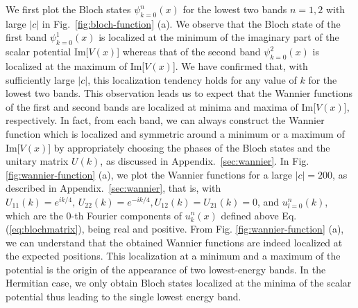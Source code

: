\documentclass[prb,superscriptaddress,floatfix,twocolumn,showpacs]{revtex4-2}
\begin{document}
We first plot the Bloch states $\psi_{k=0}^n (x)$ for the lowest two bands $n = 1,2$ with large $|c|$ in Fig.~\ref{fig:bloch-function} (a). 
We observe that the Bloch state of the first band $\psi_{k=0}^1(x)$ is localized at the minimum of the imaginary part of the scalar potential Im[$V(x)$] whereas that of the second band $\psi_{k=0}^2(x)$ is localized at the maximum of Im[$V(x)$].
We have confirmed that, with sufficiently large $|c|$, this localization tendency holds for any value of $k$ for the lowest two bands. 
This observation leads us to expect that the Wannier functions of the first and second bands are localized at minima and maxima of Im[$V(x)$], respectively.
In fact, from each band, we can always construct the Wannier function which is localized and symmetric around a minimum or a maximum of Im[$V(x)$] by appropriately choosing the phases of the Bloch states and the unitary matrix $U(k)$, as discussed in Appendix.~\ref{sec:wannier}.
In Fig. \ref{fig:wannier-function} (a), we plot the Wannier functions for a large $|c|=200$, as described in Appendix.~\ref{sec:wannier}, that is, with $U_{11}(k)=e^{ik/4},\,U_{22}(k)=e^{-ik/4}, U_{12}(k)=U_{21}(k)=0$, and  $u_{l=0}^n (k)$, which are the $0$-th Fourier components of $u_k^n(x)$ defined above Eq. (\ref{eq:blochmatrix}), being real and positive. 
From Fig. \ref{fig:wannier-function} (a), we can understand that the obtained Wannier functions are indeed localized at the expected positions. 
This localization at a minimum and a maximum of the potential is the origin of the appearance of two lowest-energy bands. 
In the Hermitian case, we only obtain Bloch states localized at the minima of the scalar potential thus leading to the single lowest energy band.
\end{document}
